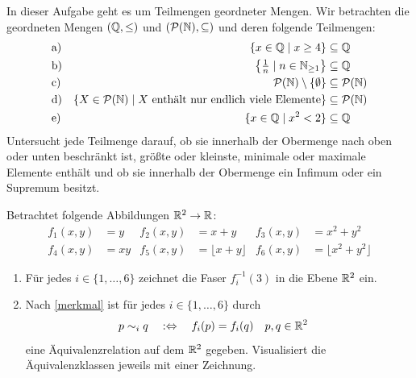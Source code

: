 \begin{aufg}[Schranken]
    In dieser Aufgabe geht es um Teilmengen geordneter Mengen. Wir betrachten die geordneten Mengen $(\mathbb Q,\le)$ und $(\mathcal P(\mathbb N),\subseteq)$ und deren folgende Teilmengen:
    \begin{align*}
        & \text{a)} & \{x\in \mathbb Q \mid x\ge 4\} & \subseteq \mathbb Q \\
        & \text{b)} & \left\{\tfrac{1}{n}\mid n\in \mathbb N_{\ge 1}\right\} & \subseteq \mathbb Q \\
        & \text{c)} & \mathcal P(\mathbb N)\setminus \{\emptyset\} & \subseteq \mathcal P(\mathbb N) \\
        & \text{d)} & \{X\in\mathcal P(\mathbb N)\mid X\ \text{enthält nur endlich viele Elemente}\} & \subseteq \mathcal P(\mathbb N) \\
        & \text{e)} & \{x\in \mathbb Q \mid x^2<2\} & \subseteq \mathbb Q
    \end{align*}
    Untersucht jede Teilmenge darauf, ob sie innerhalb der Obermenge nach oben oder unten beschränkt ist, größte oder kleinste, minimale oder maximale Elemente enthält und ob sie innerhalb der Obermenge ein Infimum oder ein Supremum besitzt.
\end{aufg}


\begin{aufg}
    Betrachtet folgende Abbildungen $\mathbb R^2\to \mathbb R$:
    \begin{align*}
        f_1(x,y) & = y     & f_2(x,y) & = x+y                    & f_3(x,y) & = x^2+y^2 \\
        f_4(x,y) & = xy    & f_5(x,y) & = \lfloor x + y\rfloor   & f_6(x,y) & = \lfloor x^2+y^2\rfloor
    \end{align*}
    \begin{enumerate}
        \item Für jedes $i\in\{1,\dots , 6\}$ zeichnet die Faser $f_i^{-1}(3)$ in die Ebene $\mathbb R^2$ ein.
        \item Nach \cref{merkmal} ist für jedes $i\in\{1,\dots , 6\}$ durch
        \begin{align*}
            p\sim_i q \quad &:\Leftrightarrow\quad f_i(p)=f_i(q) && p,q\in \mathbb R^2
        \end{align*}
        eine Äquivalenzrelation auf dem $\mathbb R^2$ gegeben. Visualisiert die Äquivalenzklassen jeweils mit einer Zeichnung.
    \end{enumerate}
\end{aufg}

